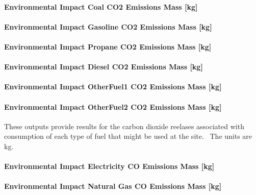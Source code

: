 \paragraph{Environmental Impact Coal CO2 Emissions Mass {[}kg{]}}\label{environmental-impact-coal-co2-emissions-mass-kg}

\paragraph{Environmental Impact Gasoline CO2 Emissions Mass {[}kg{]}}\label{environmental-impact-gasoline-co2-emissions-mass-kg}

\paragraph{Environmental Impact Propane CO2 Emissions Mass {[}kg{]}}\label{environmental-impact-propane-co2-emissions-mass-kg}

\paragraph{Environmental Impact Diesel CO2 Emissions Mass {[}kg{]}}\label{environmental-impact-diesel-co2-emissions-mass-kg}

\paragraph{Environmental Impact OtherFuel1 CO2 Emissions Mass {[}kg{]}}\label{environmental-impact-otherfuel1-co2-emissions-mass-kg}

\paragraph{Environmental Impact OtherFuel2 CO2 Emissions Mass {[}kg{]}}\label{environmental-impact-otherfuel2-co2-emissions-mass-kg}

These outputs provide results for the carbon dioxide reelases associated with consumption of each type of fuel that might be used at the site.~ The units are kg.

\paragraph{Environmental Impact Electricity CO Emissions Mass {[}kg{]}}\label{environmental-impact-electricity-co-emissions-mass-kg}

\paragraph{Environmental Impact Natural Gas CO Emissions Mass {[}kg{]}}\label{environmental-impact-natural-gas-co-emissions-mass-kg}

